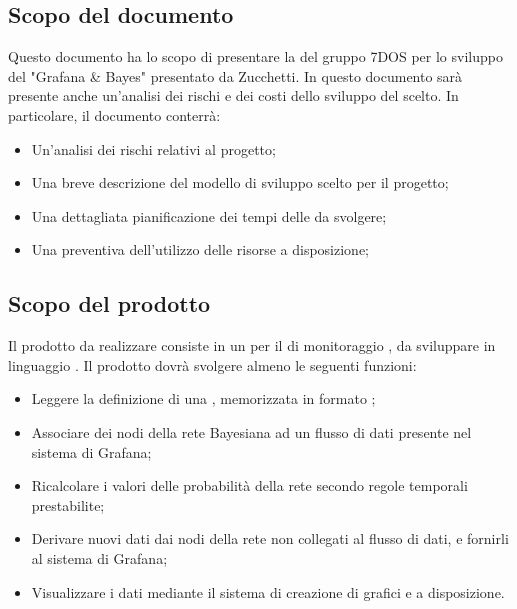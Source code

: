 \subsection{Scopo del documento}
Questo documento ha lo scopo di presentare la  del gruppo 7DOS per lo sviluppo del  "Grafana \& Bayes" presentato da Zucchetti. In questo documento sarà presente anche un'analisi dei rischi e dei costi dello sviluppo del  scelto.
In particolare, il documento conterrà:
\begin{itemize}
	\item Un'analisi dei rischi relativi al progetto;
	\item Una breve descrizione del modello di sviluppo scelto per il progetto;
	\item Una dettagliata pianificazione dei tempi delle  da svolgere;
	\item Una  preventiva dell'utilizzo delle risorse a disposizione;
\end{itemize}


\subsection{Scopo del prodotto}
Il prodotto da realizzare consiste in un  per il  di monitoraggio , da sviluppare in linguaggio . Il prodotto dovrà svolgere almeno le seguenti funzioni:
\begin{itemize}
	\item{Leggere la definizione di una , memorizzata in formato ;}
	\item{Associare dei nodi della rete Bayesiana ad un flusso di dati presente nel sistema di Grafana;}
	\item{Ricalcolare i valori delle probabilità della rete secondo regole temporali prestabilite;}
	\item{Derivare nuovi dati dai nodi della rete non collegati al flusso di dati, e fornirli al sistema di Grafana;}
	\item{Visualizzare i dati mediante il sistema di creazione di grafici e  a disposizione.}
\end{itemize}

